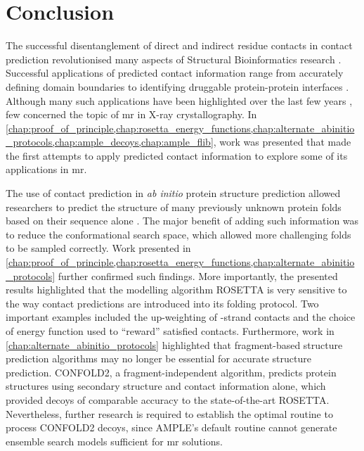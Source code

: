 \section{Conclusion}
The successful disentanglement of direct and indirect residue contacts in contact prediction revolutionised many aspects of Structural Bioinformatics research \cite{Simkovic2017-xs}. Successful applications of predicted contact information range from accurately defining domain boundaries \cite{Sadowski2013-zu} to identifying druggable protein-protein interfaces \cite{Bai2016-sw}. Although many such applications have been highlighted over the last few years \cite{Simkovic2017-xs}, few concerned the topic of \gls{mr} in X-ray crystallography. In \cref{chap:proof_of_principle,chap:rosetta_energy_functions,chap:alternate_abinitio_protocols,chap:ample_decoys,chap:ample_flib}, work was presented that made the first attempts to apply predicted contact information to explore some of its applications in \gls{mr}.

The use of contact prediction in \textit{ab initio} protein structure prediction allowed researchers to predict the structure of many previously unknown protein folds based on their sequence alone \cite[e.g.,][]{Marks2011-os,Michel2014-eg,Kosciolek2014-bt,Ovchinnikov2015-tn,Ovchinnikov2016-jj,Michel2017-xh,De_Oliveira2017-sg,Ovchinnikov2017-nd,Wang2017-rx}. The major benefit of adding such information was to reduce the conformational search space, which allowed more challenging folds to be sampled correctly. Work presented in \cref{chap:proof_of_principle,chap:rosetta_energy_functions,chap:alternate_abinitio_protocols} further confirmed such findings. More importantly, the presented results highlighted that the modelling algorithm ROSETTA is very sensitive to the way contact predictions are introduced into its folding protocol. Two important examples included the up-weighting of \textbeta-strand contacts and the choice of energy function used to ``reward'' satisfied contacts. Furthermore, work in \cref{chap:alternate_abinitio_protocols} highlighted that fragment-based structure prediction algorithms may no longer be essential for accurate structure prediction. CONFOLD2, a fragment-independent algorithm, predicts protein structures using secondary structure and contact information alone, which provided decoys of comparable accuracy to the state-of-the-art ROSETTA. Nevertheless, further research is required to establish the optimal routine to process CONFOLD2 decoys, since AMPLE's default routine cannot generate ensemble search models sufficient for \gls{mr} solutions.

